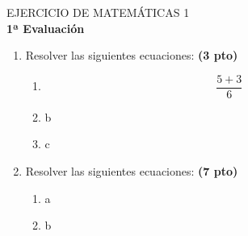 \documentclass[10pt,a4paper]{article}
\begin{document}
\begin{center}
	\item \textcolor[rgb]{1,0,0}{\LARGE EJERCICIO DE MATEMÁTICAS 1}
	\vspace{2cm} \\
	{\LARGE \bf 1ª Evaluación}
\end{center}
\begin{flushleft}
	\begin{enumerate}
		\item \textcolor[rgb]{0,0,0}{Resolver las siguientes 						ecuaciones:} \textcolor [rgb]{0,0,1}{\bf (3 pto)}
			\begin{enumerate}
				\item $$\frac{5+3}{6}$$
				\item b
				\item c
			\end{enumerate}
		\item \textcolor[rgb]{0,0,0}{Resolver las siguientes 						ecuaciones:} \textcolor [rgb]{0,0,1}{\bf (7 pto)}
			\begin{enumerate}
				\item a
				\item b
			\end{enumerate}
	\end{enumerate}
\end{flushleft}
\end{document}
